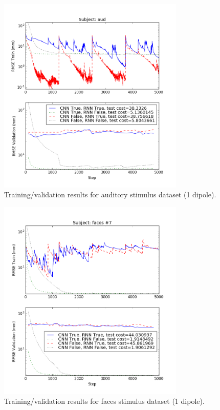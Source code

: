 \documentclass[journal]{IEEEtran}
\begin{document}
\begin{figure}[h!]
\centering
\includegraphics[width=3.5in]{aud1}
\caption{Training/validation results for auditory stimulus dataset (1 dipole).}
\label{fig:aud}
\end{figure}


\begin{figure}[h!]
\centering
\includegraphics[width=3.5in]{faces1}
\caption{Training/validation results for faces stimulus dataset (1 dipole).}
\label{fig:faces}
\end{figure}
\end{document}
